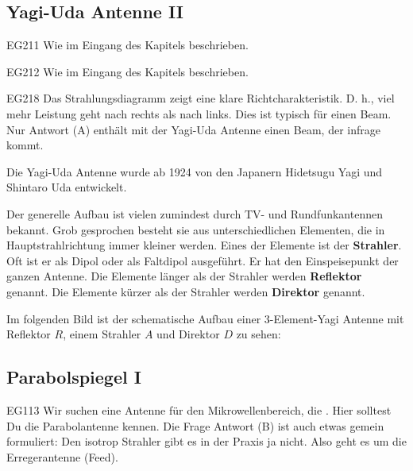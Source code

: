 \subsection{Yagi-Uda Antenne II}

\begin{sol}{EG211}
    Wie im Eingang des Kapitels beschrieben.
\end{sol}


\begin{sol}{EG212}
    Wie im Eingang des Kapitels beschrieben.
\end{sol}


\begin{sol}{EG218}
    Das Strahlungsdiagramm zeigt eine klare Richtcharakteristik. D. h., viel mehr Leistung geht nach rechts als nach links. Dies ist typisch für einen Beam.
    Nur Antwort (A) enthält mit der Yagi-Uda Antenne einen Beam, der infrage kommt.
\end{sol}

\begin{ohmchapter}
Die Yagi-Uda Antenne wurde ab 1924 von den Japanern Hidetsugu Yagi und Shintaro Uda entwickelt. 

Der generelle Aufbau ist vielen zumindest durch TV- und Rundfunkantennen bekannt. Grob gesprochen besteht sie aus unterschiedlichen Elementen, die in Hauptstrahlrichtung immer kleiner werden. 
Eines der Elemente ist der \textbf{Strahler}. Oft ist er als Dipol oder als Faltdipol ausgeführt. Er hat den Einspeisepunkt der ganzen Antenne.
Die Elemente länger als der Strahler werden \textbf{Reflektor} genannt. Die Elemente kürzer als der Strahler werden \textbf{Direktor} genannt. 

Im folgenden Bild ist der schematische Aufbau einer 3-Element-Yagi Antenne mit Reflektor $R$, einem Strahler $A$ und Direktor $D$ zu sehen:

\end{ohmchapter}



\subsection{Parabolspiegel I}

\begin{sol}{EG113}
   Wir suchen eine Antenne für den Mikrowellenbereich, die . Hier solltest Du die Parabolantenne kennen. Die Frage Antwort (B) ist auch etwas gemein formuliert: Den isotrop Strahler gibt es in der Praxis ja nicht. Also geht es um die Erregerantenne (Feed).
\end{sol}

